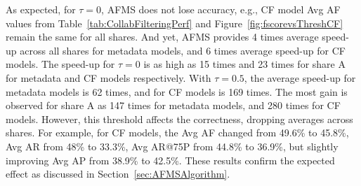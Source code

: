 As expected, for $\tau = 0$, AFMS does not lose accuracy, e.g., CF
model Avg AF values from Table~\ref{tab:CollabFilteringPerf} and
Figure~\ref{fig:fscorevsThreshCF} remain the same for all shares.  And
yet, AFMS provides 4 times average speed-up across all shares for metadata models, and 
6 times average speed-up for CF models. The speed-up for $\tau = 0$ is as high as 15 times and 23 times for share A for metadata and CF models respectively. 
With $\tau = 0.5$, the average speed-up for metadata models is 62 times, and for CF models is 169 times. The most gain is observed for share A as 147 times for metadata models, and 280 times for CF models. However, this
threshold affects the correctness, dropping averages across shares. For example, for CF models, the Avg AF changed 
from 49.6\% to 45.8\%, Avg AR from 48\% to 33.3\%, Avg AR@75P from 44.8\% to 36.9\%, but
slightly improving Avg AP from 38.9\% to 42.5\%.  These results
confirm the expected effect as discussed in
Section~\ref{sec:AFMSAlgorithm}.

